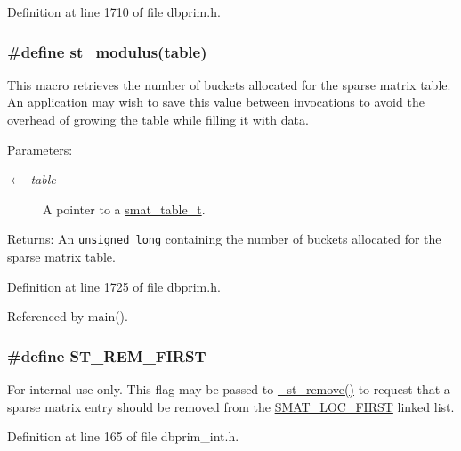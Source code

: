 Definition at line 1710 of file dbprim.h.\hypertarget{group__dbprim__smat_ga37}{
\subsubsection[st\_\-modulus]{\setlength{\rightskip}{0pt plus 5cm}\#define st\_\-modulus(table)}}
\label{group__dbprim__smat_ga37}


This macro retrieves the number of buckets allocated for the sparse matrix table. An application may wish to save this value between invocations to avoid the overhead of growing the table while filling it with data.

\begin{Desc}
\item[Parameters:]
\begin{description}
\item[\mbox{$\leftarrow$} {\em table}]A pointer to a \hyperlink{group__dbprim__smat_ga0}{smat\_\-table\_\-t}.\end{description}
\end{Desc}
\begin{Desc}
\item[Returns:]An {\tt unsigned long} containing the number of buckets allocated for the sparse matrix table.\end{Desc}


Definition at line 1725 of file dbprim.h.

Referenced by main().\hypertarget{group__dbprim__smat_ga66}{
\subsubsection[ST\_\-REM\_\-FIRST]{\setlength{\rightskip}{0pt plus 5cm}\#define ST\_\-REM\_\-FIRST}}
\label{group__dbprim__smat_ga66}


\begin{Desc}
\item[For internal use only.]
This flag may be passed to \hyperlink{group__dbprim__smat_ga24}{\_\-st\_\-remove()} to request that a sparse matrix entry should be removed from the \hyperlink{group__dbprim__smat_gga70a137}{SMAT\_\-LOC\_\-FIRST} linked list.\end{Desc}


Definition at line 165 of file dbprim\_\-int.h.

